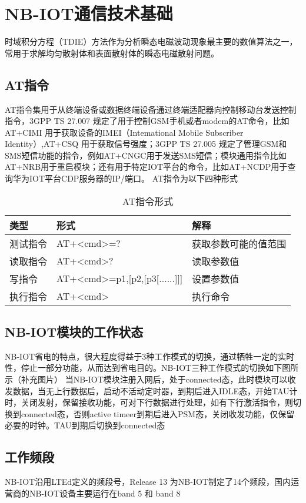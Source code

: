 \chapter{NB-IOT通信技术基础}
时域积分方程（TDIE）方法作为分析瞬态电磁波动现象最主要的数值算法之一，常用于求解均匀散射体和表面散射体的瞬态电磁散射问题。

\section{AT指令}
AT指令集用于从终端设备或数据终端设备通过终端适配器向控制移动台发送控制指令，3GPP TS 27.007 规定了用于控制GSM手机或者modem的AT命令，比如 AT+CIMI 用于获取设备的IMEI（Intemational Mobile Subscriber Identity）,AT+CSQ 用于获取信号强度；3GPP TS 27.005 规定了管理GSM和SMS短信功能的指令，例如AT+CNGC用于发送SMS短信；模块通用指令比如 AT+NRB用于重启模块；还有用于特定IOT平台的命令，比如AT+NCDP用于查询华为IOT平台CDP服务器的IP/端口。
AT指令为以下四种形式

\begin{table}[h!]
\caption{AT指令形式}
\begin{tabular}{lll}
\toprule
类型&形式&解释\\
\midrule
测试指令&AT+<cmd>=?&获取参数可能的值范围\\
读取指令&AT+<cmd>?&读取参数值\\
写指令&AT+<cmd>=p1,[p2,[p3[......]]]&设置参数值\\
执行指令&AT+<cmd>&执行命令\\
\bottomrule
\end{tabular}
\label{AT指令形式}
\end{table}


\section{NB-IOT模块的工作状态}
NB-IOT省电的特点，很大程度得益于3种工作模式的切换，通过牺牲一定的实时性，停止一部分功能，从而达到省电目的。NB-IOT三种工作模式的切换如下图所示（补充图片）
当NB-IOT模块注册入网后，处于connected态，此时模块可以收发数据，当无上行数据后，启动不活动定时器，到期后进入IDLE态，开始TAU计时，关闭发射，保留接收功能，可对下行数据进行处理，如有下行激活指令，则切换到connected态，否则active timeer到期后进入PSM态，关闭收发功能，仅保留必要的时钟。TAU到期后切换到connected态

\section{工作频段}
NB-IOT沿用LTEd定义的频段号，Release 13 为NB-IOT制定了14个频段，国内运营商的NB-IOT设备主要运行在band 5 和 band 8


